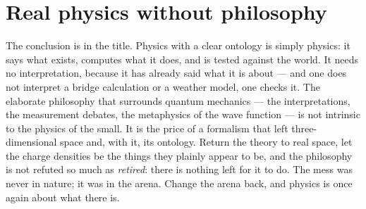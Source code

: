 \section{Real physics without philosophy}\label{sec:no-philosophy}

The conclusion is in the title. Physics with a clear ontology is simply physics: it says what exists, computes
what it does, and is tested against the world. It needs no interpretation, because it has already said what it is
about --- and one does not interpret a bridge calculation or a weather model, one checks it. The elaborate
philosophy that surrounds quantum mechanics --- the interpretations, the measurement debates, the metaphysics of
the wave function --- is not intrinsic to the physics of the small. It is the price of a formalism that left
three-dimensional space and, with it, its ontology. Return the theory to real space, let the charge densities be
the things they plainly appear to be, and the philosophy is not refuted so much as \emph{retired}: there is
nothing left for it to do. The mess was never in nature; it was in the arena. Change the arena back, and physics
is once again about what there is.
